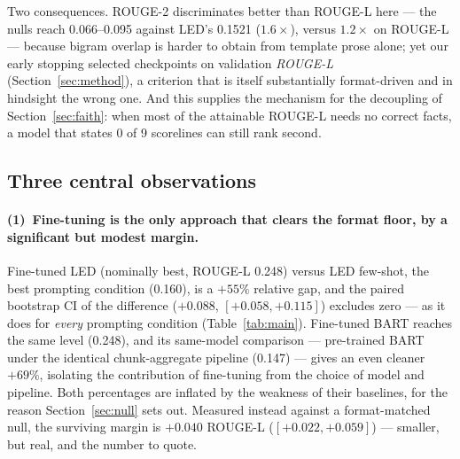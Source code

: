 \documentclass[10pt,a4paper]{article}
\begin{document}
Two consequences. ROUGE-2 discriminates better than ROUGE-L here --- the nulls reach 0.066--0.095 against LED's 0.1521 ($1.6\times$), versus $1.2\times$ on ROUGE-L --- because bigram overlap is harder to obtain from template prose alone; yet our early stopping selected checkpoints on validation \emph{ROUGE-L} (Section~\ref{sec:method}), a criterion that is itself substantially format-driven and in hindsight the wrong one. And this supplies the mechanism for the decoupling of Section~\ref{sec:faith}: when most of the attainable ROUGE-L needs no correct facts, a model that states 0 of 9 scorelines can still rank second.

\subsection{Three central observations}

\paragraph{(1)~Fine-tuning is the only approach that clears the format floor, by a significant but modest margin.}
Fine-tuned LED (nominally best, ROUGE-L 0.248) versus LED few-shot, the best prompting condition (0.160), is a $+55\%$ relative gap, and the paired bootstrap CI of the difference ($+0.088$, $[+0.058, +0.115]$) excludes zero --- as it does for \emph{every} prompting condition (Table~\ref{tab:main}). Fine-tuned BART reaches the same level (0.248), and its same-model comparison --- pre-trained BART under the identical chunk-aggregate pipeline (0.147) --- gives an even cleaner $+69\%$, isolating the contribution of fine-tuning from the choice of model and pipeline. Both percentages are inflated by the weakness of their baselines, for the reason Section~\ref{sec:null} sets out. Measured instead against a format-matched null, the surviving margin is $+0.040$ ROUGE-L ($[+0.022, +0.059]$) --- smaller, but real, and the number to quote.
\end{document}
